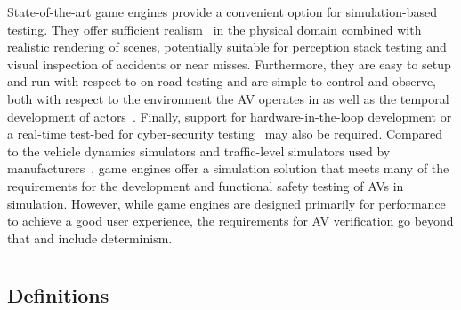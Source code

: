 \documentclass[letterpaper, 10 pt, journal, twoside]{IEEEtran}
\providecommand{\DIFaddtex}[1]{{\protect\color{blue}\uwave{#1}}} %
\providecommand{\DIFaddbegin}{} %
\providecommand{\DIFaddend}{} %
\providecommand{\DIFadd}[1]{\texorpdfstring{\DIFaddtex{#1}}{#1}} %
\begin{document}
State-of-the-art game engines provide a convenient option for simulation-based testing. They offer sufficient realism~\cite{Koopman2018} in the physical domain combined with realistic rendering of scenes, potentially suitable for perception stack testing and visual inspection of accidents or near misses. 
%
Furthermore, they are easy to setup and run with respect to on-road testing and are simple to control and observe, both with respect to the environment the AV operates in as well as the temporal development of actors~\cite{Ulbrich2015}. 
%
% 
%
Finally, support for hardware-in-the-loop development or a real-time test-bed for cyber-security testing~\cite{Javaid2013} may also be required. %
%
%
Compared to the vehicle dynamics simulators and traffic-level simulators used by manufacturers~\cite{FrameworkAndChallenges}, game engines offer a simulation solution that meets many of the requirements for the development and functional safety testing of AVs in simulation. 
%
However, while game engines are designed primarily for performance to achieve a good user experience, the requirements for AV verification go beyond that and include determinism.


\DIFaddbegin \section{\DIFadd{Preliminaries}}

\DIFaddend \subsection{Definitions}
\end{document}
